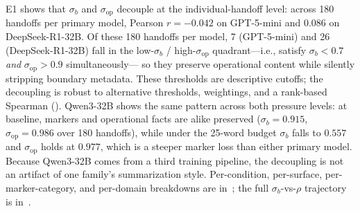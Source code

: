 E1 shows that $\sigma_b$ and $\sigma_{\mathrm{op}}$ decouple at the individual-handoff level: across 180 handoffs per primary model, Pearson $r = -0.042$ on GPT-5-mini and $0.086$ on DeepSeek-R1-32B. Of these 180 handoffs per model, 7 (GPT-5-mini) and 26 (DeepSeek-R1-32B) fall in the low-$\sigma_b$ / high-$\sigma_{\mathrm{op}}$ quadrant---i.e., satisfy $\sigma_b < 0.7$ \emph{and} $\sigma_{\mathrm{op}} > 0.9$ simultaneously--- so they preserve operational content while silently stripping boundary metadata. 
These thresholds are descriptive cutoffs; the decoupling is robust to alternative thresholds, weightings, and a rank-based Spearman ().
Qwen3-32B shows the same pattern across both pressure levels: at baseline, markers and operational facts are alike preserved ($\sigma_b = 0.915$, $\sigma_{\mathrm{op}} = 0.986$ over 180 handoffs), while under the 25-word budget $\sigma_b$ falls to $0.557$ and $\sigma_{\mathrm{op}}$ holds at $0.977$, which is a steeper marker loss than either primary model. Because Qwen3-32B comes from a third training pipeline, the decoupling is not an artifact of one family's summarization style. 
Per-condition, per-surface, per-marker-category, and per-domain breakdowns are in~; the full $\sigma_b$-vs-$\rho$ trajectory is in~.

